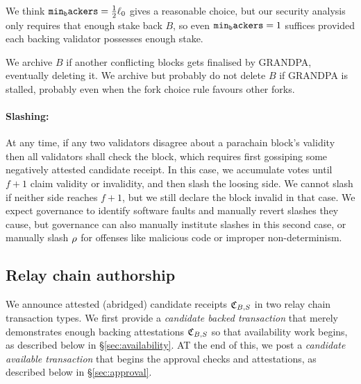We think $\mathtt{min_backers} = {1\over2} \ell_0$ gives a reasonable choice, but our security analysis only requires that enough stake back $B$, so even $\mathtt{min_backers} = 1$ suffices provided each backing validator possesses enough stake.

We archive $B$ if another conflicting blocks gets finalised by GRANDPA, eventually deleting it.  We archive but probably do not delete $B$ if GRANDPA is stalled, probably even when the fork choice rule favours other forks. 

\smallskip\paragraph{Slashing:}

At any time, if any two validators disagree about a parachain block's validity then all validators shall check the block, which requires first gossiping some negatively attested candidate receipt.  In this case, we accumulate votes until $f+1$ claim validity or invalidity, and then slash the loosing side.  We cannot slash if neither side reaches $f+1$, but we still declare the block invalid in that case.  We expect governance to identify software faults and manually revert slashes they cause, but governance can also manually institute slashes in this second case, or manually slash $\rho$ for offenses like malicious code or improper non-determinism. 


\subsection{Relay chain authorship} %
\label{sec:authorship}

We announce attested (abridged) candidate receipts $\mathfrak{C}_{B,S}$ in two relay chain transaction types.  We first provide a {\em candidate backed transaction} that merely demonstrates enough backing attestations $\mathfrak{C}_{B,S}$ so that availability work begins, as described below in \S\ref{sec:availability}.  AT the end of this, we post a {\em candidate available transaction} that begins the approval checks and attestations, as described below in \S\ref{sec:approval}.

\smallskip

